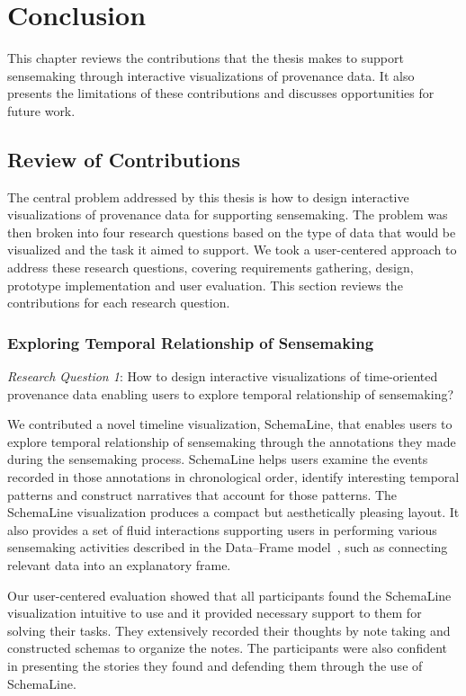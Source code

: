 \chapter{Conclusion}
\label{chap:conclusion}

This chapter reviews the contributions that the thesis makes to support sensemaking through interactive visualizations of provenance data. It also presents the limitations of these contributions and discusses opportunities for future work.

\section{Review of Contributions}
The central problem addressed by this thesis is how to design interactive visualizations of provenance data for supporting sensemaking. The problem was then broken into four research questions based on the type of data that would be visualized and the task it aimed to support. We took a user-centered approach to address these research questions, covering requirements gathering, design, prototype implementation and user evaluation. This section reviews the contributions for each research question.

\subsection{Exploring Temporal Relationship of Sensemaking}
\emph{Research Question 1}: How to design interactive visualizations of time-oriented provenance data enabling users to explore temporal relationship of sensemaking?

We contributed a novel timeline visualization, SchemaLine, that enables users to explore temporal relationship of sensemaking through the annotations they made during the sensemaking process. SchemaLine helps users examine the events recorded in those annotations in chronological order, identify interesting temporal patterns and construct narratives that account for those patterns. The SchemaLine visualization produces a compact but aesthetically pleasing layout. It also provides a set of fluid interactions supporting users in performing various sensemaking activities described in the Data--Frame model~\cite{Klein2003}, such as connecting relevant data into an explanatory frame. 

Our user-centered evaluation showed that all participants found the SchemaLine visualization intuitive to use and it provided necessary support to them for solving their tasks. They extensively recorded their thoughts by note taking and constructed schemas to organize the notes. The participants were also confident in presenting the stories they found and defending them through the use of SchemaLine.
	

